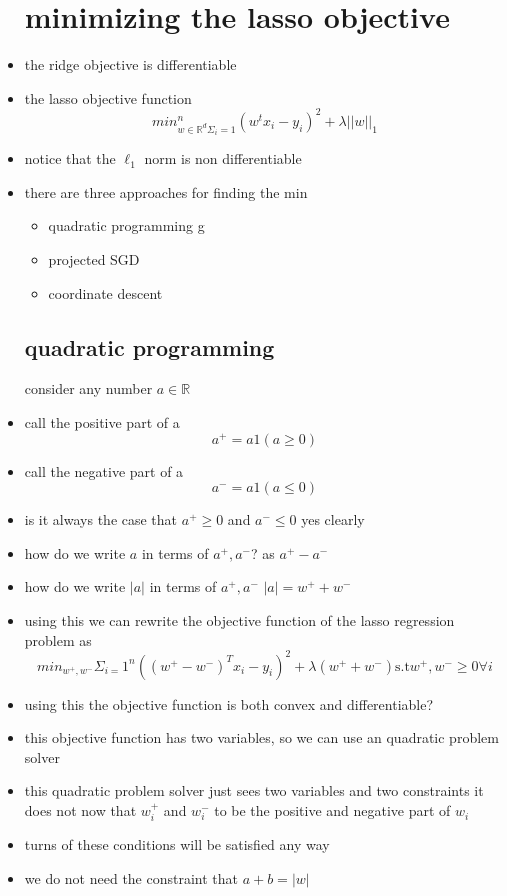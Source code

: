 \documentclass{article}
\begin{document}
\begin{itemize}
\section{minimizing the lasso objective}
\item the ridge objective is differentiable  
\item the lasso objective function $$min_{w\in \mathbb{R}^{d}\Sigma_i=1}^{n}(w^{t}x_i-y_i)^{2}+\lambda||w||_{1}$$
\item notice that the $\ell_{1}$ norm is non differentiable
\item there are three approaches for finding the min
\begin{itemize}
    \item quadratic programming g
    \item projected SGD
    \item coordinate descent 
\end{itemize}
\subsection{quadratic programming }
\itemt consider any number $a\in \mathbb{R}$
\item call the positive part of a $$a^{+}=a1(a\geq 0)$$
\item call the negative part of a $$a^{-}=a1(a\leq 0)$$
\item is it always the case that $a^{+}\geq 0$ and $a^{-}\leq 0$ yes clearly
\item how do we write $a $ in terms of $a^{+},a^{-}$? as $a^{+}-a^{-}$ 
\item how do we write $|a|$ in terms of $a^{+}, a^{-}$ $|a|=w^{+}+w^{-}$
\item using this we can rewrite the objective function of the lasso regression problem as 
$$min_{w^{+},w^{-}}\Sigma_{i=}1^{n}((w^+-w^-)^{T}x_i-y_i)^{2}+\lambda (w^{+}+w^{-}) \text{s.t} w^{+}, w^{-}\geq 0 \forall i$$
\item using this the objective function is both convex and differentiable?
\item this objective function has two variables,  so we can use an quadratic problem solver
\item this quadratic problem solver just sees two variables and two constraints it does not now that $w_{i}^{+}$ and $w_{i}^{-}$ to be the positive and negative part of $w_i$
\item turns of these conditions will be satisfied any way 
\item we do not need the constraint that $a+b=|w|$

\end{itemize}
\end{document}
